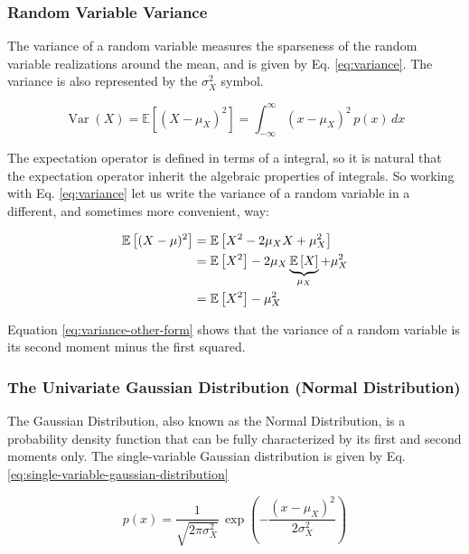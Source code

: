 \documentclass[12pt]{article}
\begin{document}
\subsubsection{Random Variable Variance}
The variance of a random variable measures the sparseness of the random variable realizations around the mean, and is given by Eq. \ref{eq:variance}. The variance is also represented by the $\sigma_X^2$ symbol.

\begin{equation}
    \mathop{Var}(X) = \mathbb{E}\left[ (X - \mu_X)^2 \right] = \int_{-\infty}^{\infty} (x - \mu_X)^2 \, p(x) \, dx
    \label{eq:variance}
\end{equation}

The expectation operator is defined in terms of a integral, so it is natural that the expectation operator inherit the algebraic properties of integrals. So working with Eq. \ref{eq:variance} let us write the variance of a random variable in a different, and sometimes more convenient, way:

\begin{equation}
\begin{aligned}
    \mathbb{E}\left[(X-\mu)^2\right] &= \mathbb{E}\left[ X^2 -2\mu_X X + \mu_X^2\right] \\
    &= \mathbb{E}\left[X^2\right] - 2\mu_X \underbrace{\mathbb{E}\left[X\right]}_{\mu_X} + \mu_X^2 \\
    &= \mathbb{E}\left[X^2\right] - \mu_X^2 \\
\end{aligned}
\label{eq:variance-other-form}
\end{equation}

Equation \ref{eq:variance-other-form} shows that the variance of a random variable is its second moment minus the first squared.

\subsubsection{The Univariate Gaussian Distribution (Normal Distribution)}
The Gaussian Distribution, also known as the Normal Distribution, is a probability density function that can be fully characterized by its first and second moments only. The single-variable Gaussian distribution is given by Eq. \ref{eq:single-variable-gaussian-distribution}

\begin{equation}
    p(x) = \frac{1}{\sqrt{2\pi\sigma_X^2}} \, \exp{\left(-\dfrac{(x-\mu_X)^2}{2\sigma_X^2}\right)}
    \label{eq:single-variable-gaussian-distribution}
\end{equation}
\end{document}
